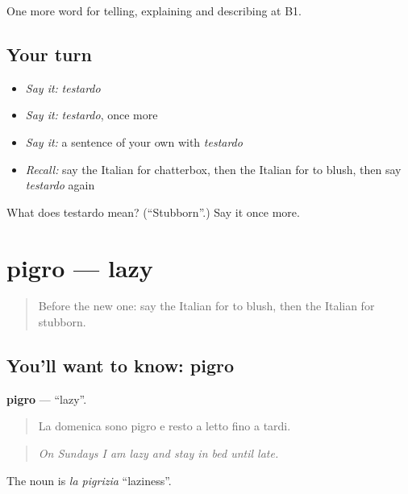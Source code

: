 \begin{grammarlens}[title={What you've built}]
One more word for telling, explaining and describing at B1.
\end{grammarlens}

\subsection*{Your turn}
\begin{itemize}
\raggedright
  \item \emph{Say it:} \emph{testardo}
  \item \emph{Say it:} \emph{testardo}, once more
  \item \emph{Say it:} a sentence of your own with \emph{testardo}
  \item \emph{Recall:} say the Italian for chatterbox, then the Italian for to blush, then say \emph{testardo} again
\end{itemize}

\begin{tcolorbox}[breakable,colback=teal!4,colframe=teal!35!black,title={Before you move on}]
What does testardo mean? (\textquotedblleft{}Stubborn\textquotedblright{}.) Say it once more.
\end{tcolorbox}
\section[pigro]{pigro — lazy}

\label{lesson:IT-C472-pigro}



\begin{quote}
Before the new one: say the Italian for to blush, then the Italian for stubborn.
\end{quote}

\subsection*{You'll want to know: pigro}
\textbf{pigro} — \textquotedblleft{}lazy\textquotedblright{}.

\begin{quote}
La domenica sono pigro e resto a letto fino a tardi.
\end{quote}

\begin{quote}
\emph{On Sundays I am lazy and stay in bed until late.}
\end{quote}

The noun is \emph{la pigrizia} \textquotedblleft{}laziness\textquotedblright{}.

